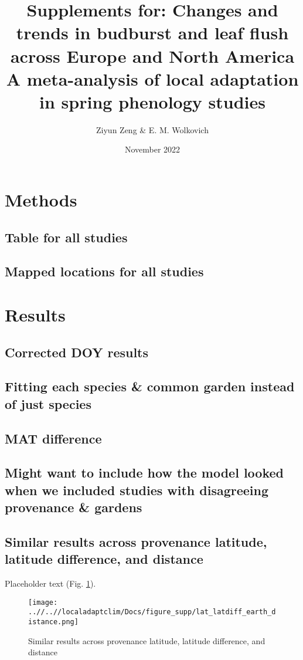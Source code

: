 \documentclass{article}
\begin{document}
\title{{\huge Supplements for: Changes and trends in budburst and leaf flush across Europe and North America} \\A meta-analysis of local adaptation in spring phenology studies}
\author{Ziyun Zeng \& E. M. Wolkovich}
\date{November 2022}
\maketitle 


\section*{Methods}
\subsection*{Table for all studies}
\subsection*{Mapped locations for all studies}

\section*{Results}




\subsection*{Corrected DOY results}
\subsection*{Fitting each species \& common garden instead of just species}
\subsection*{MAT difference}
\subsection*{Might want to include how the model looked when we included studies with disagreeing provenance \& gardens}


\subsection*{Similar results across provenance latitude, latitude difference, and distance}
Placeholder text (Fig. \ref{figure:lat_distance}).
\begin{figure}[!h] 
    \centering
 \texttt{[image: ..//..//localadaptclim/Docs/figure\_supp/lat\_latdiff\_earth\_distance.png]}
    \caption{Similar results across provenance latitude, latitude difference, and distance}
    \label{figure:lat_distance}
\end{figure}
\end{document}
